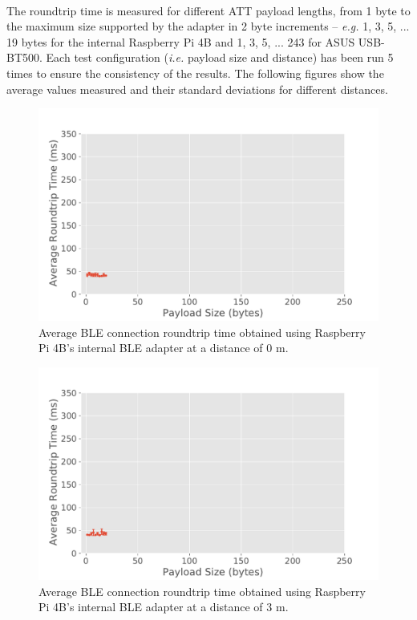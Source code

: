 \paragraph{} The roundtrip time is measured for different \acs{ATT} payload lengths, from 1 byte to the maximum size supported by the adapter in 2 byte increments -- \textit{e.g.} 1, 3, 5, ... 19 bytes for the internal Raspberry Pi 4B and 1, 3, 5, ... 243 for ASUS USB-BT500. Each test configuration (\textit{i.e.} payload size and distance) has been run 5 times to ensure the consistency of the results. The following figures show the average values measured and their standard deviations for different distances. 

\begin{figure}[H]
    \centering
    \includegraphics[width=0.9\linewidth]{images/ble-roundtrip-hci1-0cm.pdf}
    \caption[Average \acs{BLE} connection roundtrip time obtained using the Raspberry Pi 4B's internal \acs{BLE} adapter at a distance of 0 m.]{Average \acs{BLE} connection roundtrip time obtained using Raspberry Pi 4B's internal \acs{BLE} adapter at a distance of $0\text{ m}$.}
    \label{fig:ble-roundtrip-hci1-0m}
\end{figure}

\begin{figure}[H]
    \centering
    \includegraphics[width=0.9\linewidth]{images/ble-roundtrip-hci1-300cm.pdf}
    \caption[Average \acs{BLE} connection roundtrip time obtained using the Raspberry Pi 4B's internal \acs{BLE} adapter at a distance of 3 m.]{Average \acs{BLE} connection roundtrip time obtained using Raspberry Pi 4B's internal \acs{BLE} adapter at a distance of $3\text{ m}$.}
    \label{fig:ble-roundtrip-hci1-3m}
\end{figure}

